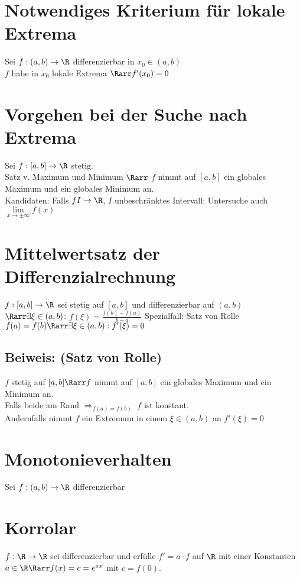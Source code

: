 \section{Notwendiges Kriterium für lokale Extrema}
Sei $f: (a,b) \to \R$ differenzierbar in $x_0 \in (a,b)$\\
$f$ habe in $x_0$ lokale Extrema $\Rarr f'(x_0) = 0$\\
\section{Vorgehen bei der Suche nach Extrema}
Sei $f:[a,b] \to \R$ stetig.\\
Satz v. Maximum und Minimum $\Rarr$ $f$ nimmt auf $[a,b]$ ein globales Maximum und ein globales Minimum an.\\
Kandidaten:
Falls $fI \to \R$, $I$ unbeschränktes Intervall: Untersuche auch $\lim\limits_{x\to ±∞} f(x)$
\section{Mittelwertsatz der Differenzialrechnung}
$f:[a,b] \to \R$ sei stetig auf $[a,b]$ und differenzierbar auf $(a,b)$\\
$\Rarr \exists \xi \in (a,b)$: $f(\xi) = \frac{f(b) - f(a)}{b-a}$
Spezialfall: Satz von Rolle $f(a) = f(b) \Rarr \exists \xi \in (a,b): f'(\xi) = 0$
\subsection*{Beiweis: (Satz von Rolle)}
$f$ stetig auf $[a,b] \Rarr f$ nimmt auf $[a,b]$ ein globales Maximum und ein Minimum an.\\
Falls beide am Rand $\Longrightarrow_{f(a) = f(b)}$ $f$ ist konstant.\\
Andernfalls nimmt $f$ ein Extremum in einem $\xi \in (a,b)$ an \Rarr $f'(\xi) = 0$
\section{Monotonieverhalten}
Sei $f:(a,b)\to \R$ differenzierbar
\section{Korrolar}
$f:\R \to \R$ sei differenzierbar und erfülle $f' = a\cdot f$ auf $\R$ mit einer Konstanten $a\in \R \Rarr f(x) = c = e^{ax}$ mit $c=f(0)$.